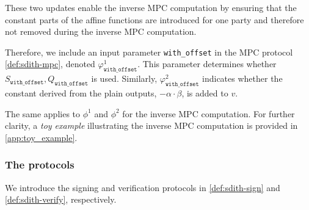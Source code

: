 \documentclass[11pt]{report}
\theoremstyle{definition}
\theoremstyle{plain}
\begin{document}
These two updates enable the inverse MPC computation by ensuring that the constant parts of the affine functions are introduced for one party and therefore not removed during the inverse MPC computation.

Therefore, we include an input parameter \texttt{with\_offset} in the MPC protocol \autoref{def:sdith-mpc}, denoted $\varphi^1_{\texttt{with\_offset}}$. This parameter determines whether $S_{\texttt{with\_offset}}, Q_{\texttt{with\_offset}}$ is used. Similarly, $\varphi^2_{\texttt{with\_offset}}$ indicates whether the constant derived from the plain outputs, $-\alpha \cdot \beta$, is added to $v$.

The same applies to $\phi^1$ and $\phi^2$ for the inverse MPC computation. For further clarity, a \textit{toy example} illustrating the inverse MPC computation is provided in \autoref{app:toy_example}.

\subsubsection{The protocols}
We introduce the signing and verification protocols in \autoref{def:sdith-sign} and \autoref{def:sdith-verify}, respectively.
\end{document}

